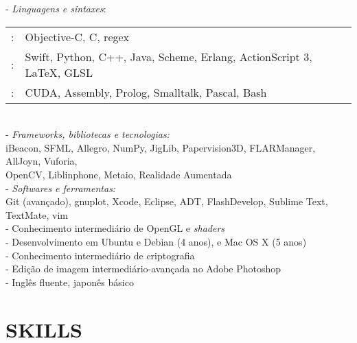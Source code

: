 \documentclass[]{res} %
\def \divspace{6pt}
\begin{document}
\begin{resume}
    - {\sl Linguagens e sintaxes}: \\
    \setlength\tabcolsep{2pt}
    \begin{tabular}{r l}
    \hspace*{1.5em}{\sl Fluente}:& Objective-C, C, regex \\
    \hspace*{1.5em}{\sl Muito Familiar}:& Swift, Python, C++, Java, Scheme, Erlang, ActionScript 3, \LaTeX, GLSL \\
    \hspace*{1.5em}{\sl Pouco Familiar}:& CUDA, Assembly, Prolog, Smalltalk, Pascal, Bash \\
    \end{tabular}
    \\
    - {\sl Frameworks, bibliotecas e tecnologias:} \\
    \hspace*{1.5em}iBeacon, SFML, Allegro, NumPy, JigLib, Papervision3D, FLARManager, AllJoyn, Vuforia, \\
    \hspace*{1.5em}OpenCV, Liblinphone, Metaio, Realidade Aumentada
    \\
    - {\sl Softwares e ferramentas:} \\
    \hspace*{1.5em}Git (avançado), gnuplot, Xcode, Eclipse, ADT, FlashDevelop, Sublime Text, TextMate, vim
    \\
    - Conhecimento intermediário de OpenGL e {\it shaders} \\
    - Desenvolvimento em Ubuntu e Debian (4 anos), e Mac OS X (5 anos) \\
    - Conhecimento intermediário de criptografia \\
    - Edição de imagem intermediário-avançada no Adobe Photoshop \\
    - Inglês fluente, japonês básico
\else
    \section{SKILLS \hspace{\divspace} }


\end{resume}
\end{document}
